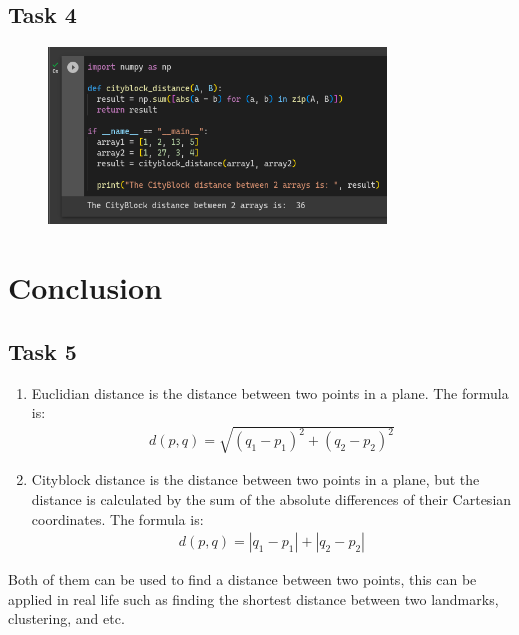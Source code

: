 \documentclass[12pt,titlepage]{article}
\begin{document}
\subsection{Task 4}
\begin{figure}[h]
    \centering
    \includegraphics[width=0.8\textwidth]{./images/task-4.png}
\end{figure}

\section{Conclusion}
\subsection{Task 5}
\begin{enumerate}
    \item {
        Euclidian distance is the distance between two points in a plane. The formula is:
        \begin{align*}
            d(p, q) = \sqrt{(q_1 - p_1)^2 + (q_2 - p_2)^2}
        \end{align*}
    }
    \item {
        Cityblock distance is the distance between two points in a plane, but the distance is calculated by the sum of the absolute differences of their Cartesian coordinates. The formula is:
        \begin{align*}
            d(p, q) = |q_1 - p_1| + |q_2 - p_2|
        \end{align*}
    }
\end{enumerate}
Both of them can be used to find a distance between two points, this can be applied in real life such as finding the shortest distance between two landmarks, clustering, and etc.
\end{document}
